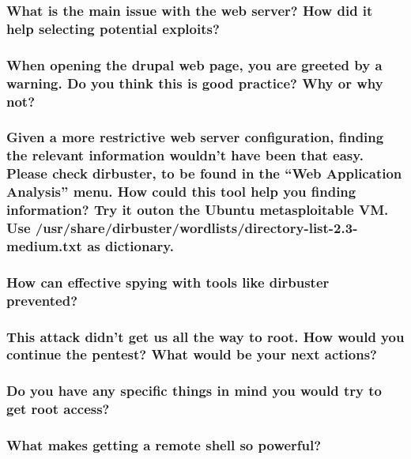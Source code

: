 \subsubsection*{What is the main issue with the web server? How did it help selecting potential exploits?}
\subsubsection*{When opening the drupal web page, you are greeted by a warning. Do you think this is good practice? Why or why not?}
\subsubsection*{Given a more restrictive web server configuration, finding the relevant information wouldn't have been that easy. Please check dirbuster, to be found in the “Web Application Analysis” menu. How could this tool help you finding information? Try it outon the Ubuntu metasploitable VM. Use /usr/share/dirbuster/wordlists/directory-list-2.3-medium.txt as dictionary.}
\subsubsection*{How can effective spying with tools like dirbuster prevented?}
\subsubsection*{This attack didn't get us all the way to root. How would you continue the pentest? What would be your next actions?}
\subsubsection*{Do you have any specific things in mind you would try to get root access?}
\subsubsection*{What makes getting a remote shell so powerful?}